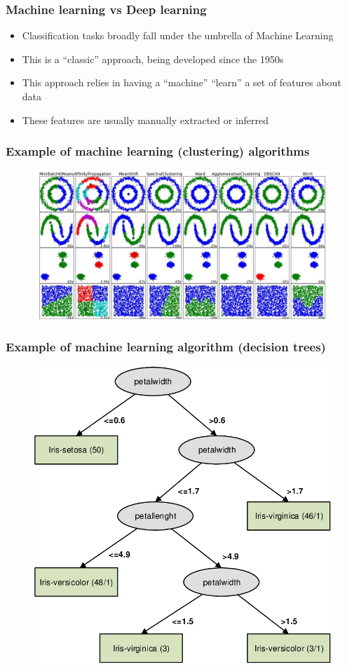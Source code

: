 \documentclass{beamer}
\begin{document}
\begin{frame}
	\frametitle{Machine learning vs Deep learning}
	\begin{itemize}
		\item Classification tasks broadly fall under the umbrella of Machine Learning
		\item This is a ``classic'' approach, being developed since the 1950s
		\item This approach relies in having a ``machine'' ``learn'' a set of features about data
		\item These features are usually manually extracted or inferred
	\end{itemize}
\end{frame}
\begin{frame}
	\frametitle{Example of machine learning (clustering) algorithms}\begin{figure}[h]
		\centering
		\includegraphics[width=\linewidth]{img/algos}
		\label{fig:algos}
	\end{figure}
\end{frame}
\begin{frame}
	\frametitle{Example of machine learning algorithm (decision trees)}
	\begin{figure}[h]
		\centering
		\includegraphics[height=0.7\textheight]{img/decisiontree}
		\label{fig:decisiontree}
	\end{figure}
\end{frame}
\end{document}
